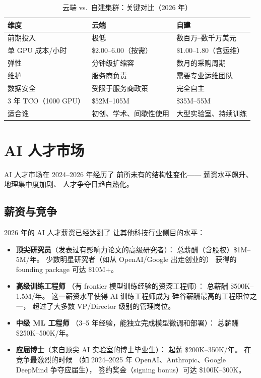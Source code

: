 \begin{table}[H]
\centering\small
\renewcommand{\arraystretch}{1.3}
\caption{云端 vs.\ 自建集群：关键对比（2026 年）}\label{tab:cloud-vs-onprem}
\begin{tabularx}{\linewidth}{l >{\raggedright\arraybackslash}X >{\raggedright\arraybackslash}X}
\toprule
\rowcolor{figLightGray}
\textbf{维度} & \textbf{云端} & \textbf{自建} \\
\midrule
前期投入 & 极低 & 数百万--数千万美元 \\
单 GPU 成本/小时 & \$2.00--6.00（按需） & \$1.00--1.80（含运维） \\
弹性 & 分钟级扩缩容 & 数月的采购周期 \\
维护 & 服务商负责 & 需要专业运维团队 \\
数据安全 & 受限于服务商政策 & 完全自主 \\
3 年 TCO（1000 GPU） & \$52M--105M & \$35M--55M \\
适合谁 & 初创、学术、间歇性使用 & 大型实验室、持续训练 \\
\bottomrule
\end{tabularx}
\end{table}

\section{AI 人才市场}
\label{sec:talent-market}

AI 人才市场在 2024--2026 年经历了
前所未有的结构性变化——
薪资水平飙升、地理集中度加剧、
人才争夺日趋白热化。

\subsection{薪资与竞争}

2026 年的 AI 人才薪资已经达到了
让其他科技行业侧目的水平：

\begin{itemize}[noitemsep]
  \item \textbf{顶尖研究员}（发表过有影响力论文的高级研究者）：
        总薪酬（含股权）\$1M--5M/年。
        少数明星研究者（如从 OpenAI/Google 出走创业的）
        获得的 founding package 可达 \$10M+。
  \item \textbf{高级训练工程师}
        （有 frontier 模型训练经验的资深工程师）：
        总薪酬 \$500K--1.5M/年。
        这一薪资水平使得 AI 训练工程师成为
        硅谷薪酬最高的工程职位之一，
        超过了大多数 VP/Director 级别的管理岗位。
  \item \textbf{中级 ML 工程师}
        （3--5 年经验，能独立完成模型微调和部署）：
        总薪酬 \$250K--500K/年。
  \item \textbf{应届博士}（来自顶尖 AI 实验室的博士毕业生）：
        起薪 \$200K--350K/年。
        在竞争最激烈的时候
        （如 2024--2025 年 OpenAI、Anthropic、Google DeepMind 争夺应届生），
        签约奖金（signing bonus）可达 \$100K--300K。
\end{itemize}

